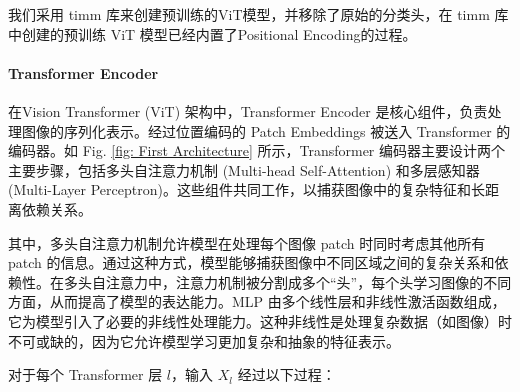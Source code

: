 \documentclass[a4paper]{ctexart}
\begin{document}
	我们采用 timm 库来创建预训练的ViT模型，并移除了原始的分类头，在 timm 库中创建的预训练 ViT 模型已经内置了Positional Encoding的过程。
	
	\paragraph{Transformer Encoder}
	
	在Vision Transformer (ViT) 架构中，Transformer Encoder 是核心组件，负责处理图像的序列化表示。经过位置编码的 Patch Embeddings 被送入 Transformer 的编码器。如 Fig. \ref{fig: First Architecture} 所示，Transformer 编码器主要设计两个主要步骤，包括多头自注意力机制 (Multi-head Self-Attention) 和多层感知器 (Multi-Layer Perceptron)。这些组件共同工作，以捕获图像中的复杂特征和长距离依赖关系。
	
	其中，多头自注意力机制允许模型在处理每个图像 patch 时同时考虑其他所有 patch 的信息。通过这种方式，模型能够捕获图像中不同区域之间的复杂关系和依赖性。在多头自注意力中，注意力机制被分割成多个“头”，每个头学习图像的不同方面，从而提高了模型的表达能力。MLP 由多个线性层和非线性激活函数组成，它为模型引入了必要的非线性处理能力。这种非线性是处理复杂数据（如图像）时不可或缺的，因为它允许模型学习更加复杂和抽象的特征表示。
	
	对于每个 Transformer 层 $l$，输入 $X_l$ 经过以下过程：
	
\end{document}
